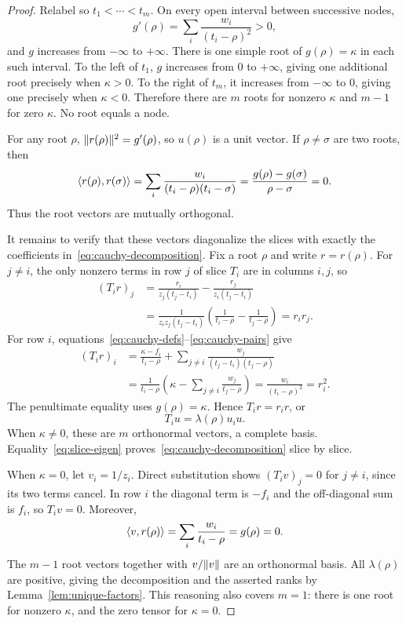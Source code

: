 \begin{proof}
Relabel so $t_1<\cdots<t_m$. On every open interval between successive nodes,
\[
 g'(\rho)=\sum_i\frac{w_i}{(t_i-\rho)^2}>0,
\]
and $g$ increases from $-\infty$ to $+\infty$. There is one simple root of $g(\rho)=\kappa$ in each such interval. To the left of $t_1$, $g$ increases from $0$ to $+\infty$, giving one additional root precisely when $\kappa>0$. To the right of $t_m$, it increases from $-\infty$ to $0$, giving one precisely when $\kappa<0$. Therefore there are $m$ roots for nonzero $\kappa$ and $m-1$ for zero $\kappa$. No root equals a node.

For any root $\rho$, $\lVert r(\rho)\rVert^2=g'(\rho)$, so $u(\rho)$ is a unit vector. If $\rho\ne\sigma$ are two roots, then
\begin{equation}\label{eq:root-orthogonality}
 \langle r(\rho),r(\sigma)\rangle
 =\sum_i\frac{w_i}{(t_i-\rho)(t_i-\sigma)}
 =\frac{g(\rho)-g(\sigma)}{\rho-\sigma}=0.
\end{equation}
Thus the root vectors are mutually orthogonal.

It remains to verify that these vectors diagonalize the slices with exactly the coefficients in~\eqref{eq:cauchy-decomposition}. Fix a root $\rho$ and write $r=r(\rho)$. For $j\ne i$, the only nonzero terms in row $j$ of slice $T_i$ are in columns $i,j$, so
\begin{align*}
 (T_ir)_j
 &=\frac{r_i}{z_j(t_j-t_i)}
    -\frac{r_j}{z_i(t_j-t_i)}\\
 &=\frac{1}{z_iz_j(t_j-t_i)}
   \left(\frac{1}{t_i-\rho}-\frac{1}{t_j-\rho}\right)
 =r_ir_j.
\end{align*}
For row $i$, equations~\eqref{eq:cauchy-defs}--\eqref{eq:cauchy-pairs} give
\begin{align*}
 (T_ir)_i
 &=\frac{\kappa-f_i}{t_i-\rho}
   +\sum_{j\ne i}\frac{w_j}{(t_j-t_i)(t_j-\rho)}\\
 &=\frac{1}{t_i-\rho}
   \left(\kappa-\sum_{j\ne i}\frac{w_j}{t_j-\rho}\right)
 =\frac{w_i}{(t_i-\rho)^2}=r_i^2.
\end{align*}
The penultimate equality uses $g(\rho)=\kappa$. Hence $T_ir=r_ir$, or
\begin{equation}\label{eq:slice-eigen}
 T_iu=\lambda(\rho)u_i u.
\end{equation}
When $\kappa\ne0$, these are $m$ orthonormal vectors, a complete basis. Equality~\eqref{eq:slice-eigen} proves~\eqref{eq:cauchy-decomposition} slice by slice.

When $\kappa=0$, let $v_i=1/z_i$. Direct substitution shows $(T_iv)_j=0$ for $j\ne i$, since its two terms cancel. In row $i$ the diagonal term is $-f_i$ and the off-diagonal sum is $f_i$, so $T_iv=0$. Moreover,
\[
 \langle v,r(\rho)\rangle=\sum_i\frac{w_i}{t_i-\rho}=g(\rho)=0.
\]
The $m-1$ root vectors together with $v/\lVert v\rVert$ are an orthonormal basis. All $\lambda(\rho)$ are positive, giving the decomposition and the asserted ranks by Lemma~\ref{lem:unique-factors}. This reasoning also covers $m=1$: there is one root for nonzero $\kappa$, and the zero tensor for $\kappa=0$.


\end{proof}
